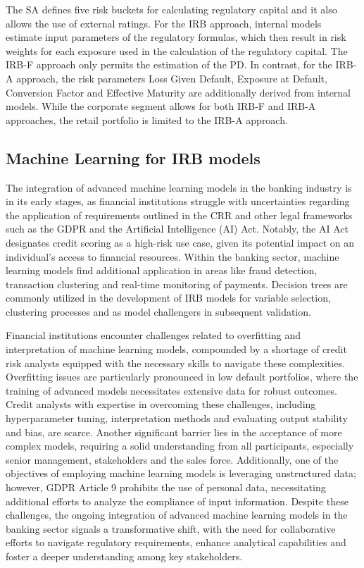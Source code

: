 The \acl{SA} defines five risk buckets for calculating regulatory capital and it also allows the use of external ratings. For the \ac{IRB} approach, internal models estimate input parameters of the regulatory formulas, which then result in risk weights for each exposure used in the calculation of the regulatory capital. The IRB-F approach only permits the estimation of the PD. In contrast, for the IRB-A approach, the risk parameters Loss Given Default, Exposure at Default, Conversion Factor and Effective Maturity are additionally derived from internal models. While the corporate segment allows for both IRB-F and IRB-A approaches, the retail portfolio is limited to the IRB-A approach. \cite[15-17]{Witzany:2017} 

\subsection{Machine Learning for IRB models}
The integration of advanced machine learning models in the banking industry is in its early stages, as financial institutions struggle with uncertainties regarding the application of requirements outlined in the \acl{CRR} and other legal frameworks such as the \ac{GDPR} and the Artificial Intelligence (AI) Act. Notably, the AI Act designates credit scoring as a high-risk use case, given its potential impact on an individual's access to financial resources. Within the banking sector, machine learning models find additional application in areas like fraud detection, transaction clustering and real-time monitoring of payments. Decision trees are commonly utilized in the development of \ac{IRB} models for variable selection, clustering processes and as model challengers in subsequent validation. 

Financial institutions encounter challenges related to overfitting and interpretation of machine learning models, compounded by a shortage of credit risk analysts equipped with the necessary skills to navigate these complexities. Overfitting issues are particularly pronounced in low default portfolios, where the training of advanced models necessitates extensive data for robust outcomes. Credit analysts with expertise in overcoming these challenges, including hyperparameter tuning, interpretation methods and evaluating output stability and bias, are scarce. Another significant barrier lies in the acceptance of more complex models, requiring a solid understanding from all participants, especially senior management, stakeholders and the sales force. Additionally, one of the objectives of employing machine learning models is leveraging unstructured data; however, \ac{GDPR} Article 9 prohibits the use of personal data, necessitating additional efforts to analyze the compliance of input information. Despite these challenges, the ongoing integration of advanced machine learning models in the banking sector signals a transformative shift, with the need for collaborative efforts to navigate regulatory requirements, enhance analytical capabilities and foster a deeper understanding among key stakeholders.\cite[pp.~4-7, 9, 11, 13]{EBA:2023}